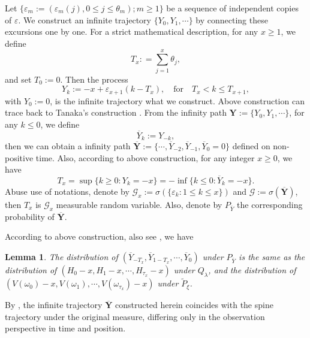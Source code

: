 \documentclass[]{article}
\numberwithin{equation}{section}
\theoremstyle{thmstyleone}%
\theoremstyle{thmstyletwo}%
\theoremstyle{thmstylethree}%
\theoremstyle{thmstylefour}%
\newtheorem{lemma}{Lemma}
\theoremstyle{thmstylefive}%
\theoremstyle{thmstylesix}%
\begin{document}
	Let $\{\varepsilon_m:= (\varepsilon_m(j),0\leqslant j\leqslant\theta_m);m\geqslant1\}$ be a sequence of independent copies of $\varepsilon$. We construct an infinite trajectory $\{Y_0,Y_1,\cdots\} $ by connecting these excursions one by one. For a strict mathematical description, for any $x\geqslant1$, we define
	\begin{equation}\label{def of Tx}
		T_x: = \sum_{j=1}^{x}\theta_j,
	\end{equation}
	and set $T_0:=0$. Then the process
	\begin{equation}\label{infinity trajectory}
		Y_k:= -x+\varepsilon_{x+1}(k-T_x), \quad \text{for} \quad T_x<k\leqslant T_{x+1},
	\end{equation}
	with $Y_0:=0$, is the infinite trajectory what we construct.
	Above construction can trace back to Tanaka’s construction \cite{Tanaka1989}.
	From the infinity path $\textbf{Y}:=\{Y_0,Y_1,\cdots\}$, for any $k\leqslant0$, we define
	\begin{equation*}
		\overline{Y}_{k} := Y_{-k},
	\end{equation*}
	then we can obtain a infinity path $\overline{\textbf{Y}}:=\{\cdots,\overline{Y}_{-2},\overline{Y}_{-1},\overline{Y}_0=0\}$ defined on non-positive time.
	Also, according to above construction, for any integer $x\geqslant 0$, we have
	\begin{equation}\label{27}
		T_x = \sup\{k\geqslant 0: Y_k = -x\} = -\inf\{k\leqslant 0:\overline{Y}_k = -x\}.
	\end{equation}
	Abuse use of notations, denote by $\mathcal{G}_x:=\sigma\left(\{\varepsilon_{k}:1\leqslant k \leqslant x\}\right)$ and  $\mathcal{G}:=\sigma\left(\overline{\textbf{Y}}\right)$, then $T_x$ is $\mathcal{G}_x$ measurable random variable. Also, denote by $P_{\overline{Y}}$ the corresponding probability of $\overline{\textbf{Y}}$.
	
	According to above construction, also see \cite{B2,Tanaka1989}, we have
	
	\begin{lemma}\label{Tanaka's construction}
		The distribution of $\left(\overline{Y}_{-T_x},\overline{Y}_{1-T_x},\cdots,\overline{Y}_{0}\right)$ under $P_{\overline{Y}}$
		is the same as the distribution of $(H_0-x,H_1-x,\cdots,H_{\tau_x}-x)$ under $Q_\lambda$, and the distribution of $\left(V(\omega_0)-x,V(\omega_1),\cdots,V(\omega_{\tau_x})-x\right)$ under $\tilde{P}_\xi$.
	\end{lemma}
	
	By , the infinite trajectory $\overline{\textbf{Y}}$ constructed herein coincides with the spine trajectory under the original measure, differing only in the observation perspective in time and position.
	
\end{document}
